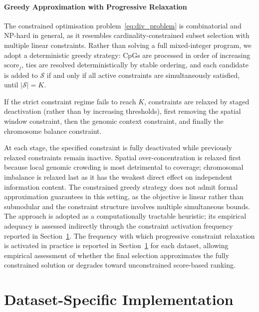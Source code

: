 \paragraph{Greedy Approximation with Progressive Relaxation}

The constrained optimisation problem~\eqref{eq:div_problem} 
is combinatorial and NP-hard in general, as it resembles 
cardinality-constrained subset selection with multiple 
linear constraints. Rather than solving a full 
mixed-integer program, we adopt a deterministic greedy 
strategy: CpGs are processed in order of increasing 
$\mathrm{score}_j$, ties are resolved deterministically by stable ordering, and each candidate is added to 
$\mathcal{S}$ if and only if all active constraints are 
simultaneously satisfied, until $|\mathcal{S}| = K$.

If the strict constraint regime fails to reach $K$, constraints are relaxed by staged deactivation (rather than by increasing thresholds), first removing the spatial window constraint, then the genomic context constraint, and finally the chromosome balance constraint.

At each stage, the specified constraint is fully deactivated while 
previously relaxed constraints remain inactive.
Spatial over-concentration is relaxed first because 
local genomic crowding is most detrimental to coverage; 
chromosomal imbalance is relaxed last as it has the 
weakest direct effect on independent information content. 
The constrained greedy strategy does not admit formal 
approximation guarantees in this setting, as the objective 
is linear rather than submodular and the constraint structure 
involves multiple simultaneous bounds. The approach is adopted 
as a computationally tractable heuristic; its empirical 
adequacy is assessed indirectly through the constraint 
activation frequency reported in 
Section~\ref{sec:fs_intra_dataset}.
The frequency with which progressive constraint relaxation is activated in practice is reported in Section~\ref{sec:fs_intra_dataset} for each dataset, allowing empirical assessment of whether the final selection approximates the fully constrained solution or degrades toward unconstrained score-based ranking.

\section{Dataset-Specific Implementation}
\label{sec:fs_intra_dataset}

